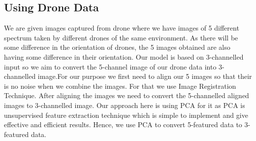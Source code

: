 \begin{multicols}{2}
\subsection{{{\fontsize{14}{19}\selectfont \textbf{Using Drone Data}}}}
We are given images captured from drone where we have images of 5 different spectrum\cite{fusion} taken by different drones of the same environment. As there will be some difference in the orientation of drones, the 5 images obtained are also having some difference in their orientation. Our model is based on 3-channelled input so we aim to convert the 5-channel image of our drone data into 3-channelled image.For our purpose we first need to align our 5 images so that their is no noise when we combine the images. For that we use Image Registration Technique. After aligning the images we need to convert the 5-channelled aligned images to 3-channelled image. Our approach here is using PCA for it as PCA is unsupervised feature extraction technique which is simple to implement and give effective and efficient results. Hence, we use PCA to convert 5-featured data to 3-featured data. 

\vspace{0.5cm}

\end{multicols}
